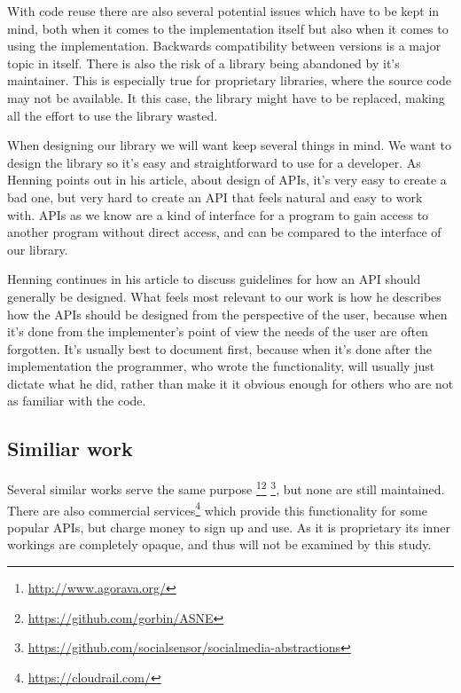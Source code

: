 \documentclass{sigchi-alternate}
\begin{document}
With code reuse there are also several potential issues which have to be kept in mind, both when it comes to the implementation itself but also
when it comes to using the implementation. Backwards compatibility between versions is a major topic in itself\cite{raemaekers2012measuring}. There
is also the risk of a library being abandoned by it’s maintainer. This is especially true for proprietary libraries, where the source code may not
be available. It this case, the library might have to be replaced, making all the effort to use the library wasted.

When designing our library we will want keep several things in mind. We want to design the library so it’s easy and straightforward to use for a
developer. As Henning points out in his article\cite{Henning:2007:ADM:1255421.1255422}, about design of APIs, it’s very easy to create a bad one,
but very hard to create an API that feels natural and easy to work with. APIs as we know are a kind of interface for a program to gain access to
another program without direct access, and can be compared to the interface of our library.

Henning continues in his article to discuss guidelines for how an API should generally be designed. What feels most relevant to our work is how
he describes how the APIs should be designed from the perspective of the user, because when it’s done from the implementer's point of view the
needs of the user are often forgotten. It’s usually best to document first, because when it’s done after the implementation the programmer, who
wrote the functionality, will usually just dictate what he did, rather than make it it obvious enough for others who are not as familiar with the code.

\subsection{Similiar work}
Several similar works serve the same purpose \footnote{\url{http://www.agorava.org/}}\footnote{\url{https://github.com/gorbin/ASNE}}
\footnote{\url{https://github.com/socialsensor/socialmedia-abstractions}}, but none are still maintained. There are also commercial
services\footnote{\url{https://cloudrail.com/}} which provide this functionality for some popular APIs, but charge money to sign up
and use. As it is proprietary its inner workings are completely opaque, and thus will not be examined by this study.
\balance


\printbibliography
\end{document}
